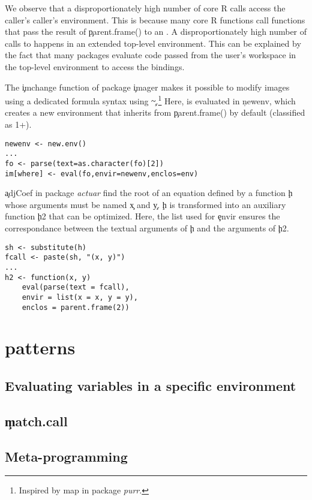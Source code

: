 \documentclass[acmsmall]{acmart}
\begin{document}
We observe that a disproportionately high number of core R \eval calls
access the caller's caller's environment. This is because many core R
functions call functions that pass the result of \c{parent.frame()} to
an \eval. A disproportionately high number of calls to \eval happens
in an extended top-level environment. This can be explained by the
fact that many packages evaluate code passed from the user's workspace
in the top-level environment to access the bindings.


The \c{imchange} function of package \c{imager} makes it possible to
modify images using a dedicated formula syntax using
\c{\~}.\footnote{Inspired by {map} in package \emph{purr}.} Here,
\eval is evaluated in \c{newenv}, which creates a new environment that
inherits from \c{parent.frame()} by default (classified as 1+).


\begin{lstlisting}
newenv <- new.env()
...
fo <- parse(text=as.character(fo)[2])
im[where] <- eval(fo,envir=newenv,enclos=env)
\end{lstlisting}

\c{adjCoef} in package \emph{actuar} find the root of an equation
defined by a function \c{h} whose arguments must be named \c{x} and
\c{y}. \c{h} is transformed into an auxiliary function \c{h2} that can
be optimized. Here, the list used for \c{envir} ensures the
correspondance between the textual arguments of \c{h} and the
arguments of \c{h2}.


\begin{lstlisting}
sh <- substitute(h)
fcall <- paste(sh, "(x, y)")
...
h2 <- function(x, y)
    eval(parse(text = fcall),
    envir = list(x = x, y = y),
    enclos = parent.frame(2))
\end{lstlisting}


\section{\eval patterns}


\subsection{Evaluating variables in a specific environment}

\subsection{\c{match.call}}

\subsection{Meta-programming}
\end{document}
